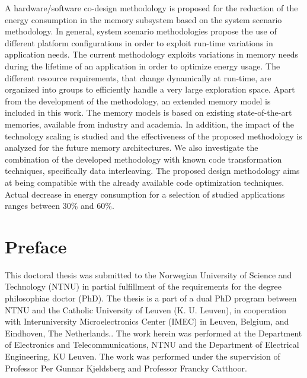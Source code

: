 A hardware/software co-design methodology is proposed for the reduction of the energy consumption in the memory subsystem based on the system scenario methodology.
In general, system scenario methodologies propose the use of different platform configurations in order to exploit run-time variations in application needs.
The current methodology exploits variations in memory needs during the lifetime of an application in order to optimize energy usage. 
The different resource requirements, that change dynamically at run-time, are organized into groups to efficiently handle a very large exploration space.
Apart from the development of the methodology, an extended memory model is included in this work. 
The memory models is based on existing state-of-the-art memories, available from industry and academia.
In addition, the impact of the technology scaling is studied and the effectiveness of the proposed methodology is analyzed for the future memory architectures.
We also investigate the combination of the developed methodology with known code transformation techniques, specifically data interleaving.
The proposed design methodology aims at being compatible with the already available code optimization techniques.
Actual decrease in energy consumption for a selection of studied applications ranges between 30\% and 60\%. 
\afterpage{\null\newpage}
\newpage


\vspace*{\fill}
\section*{\Huge Preface }
\bigskip
\bigskip
This doctoral thesis was submitted to the Norwegian University of Science and Technology (NTNU) in partial fulfillment of the requirements for the degree philosophiae doctor (PhD). 
The thesis is a part of a dual PhD program between NTNU and the Catholic University of Leuven (K. U. Leuven), in cooperation with Interuniversity Microelectronics Center (IMEC) in Leuven, Belgium, and Eindhoven, The Netherlands..
The work herein was performed at the Department of Electronics and Telecommunications, NTNU and the Department of Electrical Engineering, KU Leuven.
The work was performed under the supervision of Professor Per Gunnar Kjeldsberg and Professor Francky Catthoor.

